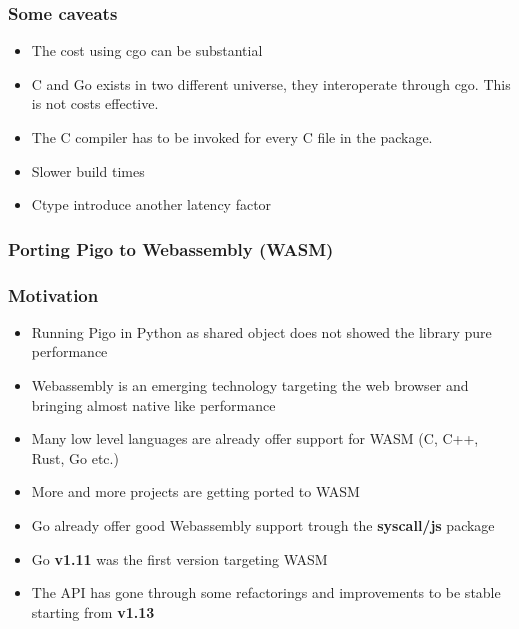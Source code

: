 \documentclass[9pt]{beamer}
\begin{document}
\begin{frame}[fragile]
\frametitle{Some caveats}


\begin{itemize}
\item The cost using cgo can be substantial
\item C and Go exists in two different universe, they interoperate through cgo. This is not costs effective.
\item The C compiler has to be invoked for every C file in the package.
\item Slower build times
\item Ctype introduce another latency factor
\end{itemize}


\end{frame}

\begin{frame}[fragile]
\frametitle{Porting Pigo to Webassembly (WASM)}


\end{frame}

\begin{frame}[fragile]
\frametitle{Motivation}


\begin{itemize}
\item Running Pigo in Python as shared object does not showed the library pure performance
\item Webassembly is an emerging technology targeting the web browser and bringing almost native like performance
\item Many low level languages are already offer support for WASM (C, C++, Rust, Go etc.)
\item More and more projects are getting ported to WASM
\item Go already offer good Webassembly support trough the \textbf{syscall/js} package
\item Go \textbf{v1.11} was the first version targeting WASM
\item The API has gone through some refactorings and improvements to be stable starting from \textbf{v1.13}
\end{itemize}


\end{frame}
\end{document}
